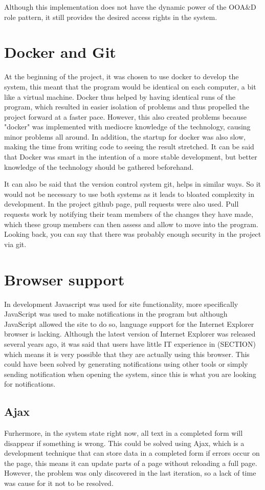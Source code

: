 Although this implementation does not have the dynamic power of the OOA\&D role pattern, it still provides the desired access rights in the system.

\section{Docker and Git}

At the beginning of the project, it was chosen to use docker to develop the system, this meant that the program would be identical on each computer, a bit like a virtual machine.
Docker thus helped by having identical runs of the program, which resulted in easier isolation of problems and thus propelled the project forward at a faster pace. However, this also created problems because "docker" was implemented with mediocre knowledge of the technology, causing minor problems all around. In addition, the startup for docker was also slow, making the time from writing code to seeing the result stretched. It can be said that Docker was smart in the intention of a more stable development, but better knowledge of the technology should be gathered beforehand. 

It can also be said that the version control system git, helps in similar ways. So it would not be necessary to use both systems as it leads to bloated complexity in development. In the project github page, pull requests were also used. Pull requests work by notifying their team members of the changes they have made, which these group members can then assess and allow to move into the program. Looking back, you can say that there was probably enough security in the project via git.

\section{Browser support}

In development Javascript was used for site functionality, more specifically JavaScript was used to make notifications in the program but although JavaScript allowed the site to do so, language support for the Internet Explorer browser is lacking. Although the latest version of Internet Explorer was released several years ago, it was said that users have little IT experience in (SECTION) which means it is very possible that they are actually using this browser. This could have been solved by generating notifications using other tools or simply sending notification when opening the system, since this is what you are looking for notifications.

\subsection{Ajax}

Furhermore, in the system state right now, all text in a completed form will disappear if something is wrong. This could be solved using Ajax, which is a development technique that can store data in a completed form if errors occur on the page, this means it can update parts of a page without reloading a full page. However, the problem was only discovered in the last iteration, so a lack of time was cause for it not to be resolved.